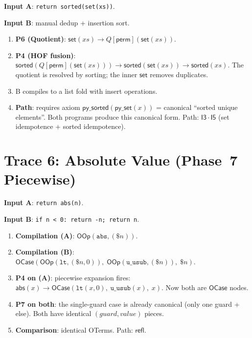 \documentclass[11pt,a4paper]{report}
\theoremstyle{definition}
\theoremstyle{plain}
\begin{document}
\textbf{Input A}: \texttt{return sorted(set(xs))}.

\textbf{Input B}: manual dedup + insertion sort.

\begin{enumerate}
  \item \textbf{P6 (Quotient)}: $\mathsf{set}(xs) \to
    Q[\mathsf{perm}](\mathsf{set}(xs))$.
  \item \textbf{P4 (HOF fusion)}:
    $\mathsf{sorted}(Q[\mathsf{perm}](\mathsf{set}(xs))) \to
    \mathsf{sorted}(\mathsf{set}(xs)) \to \mathsf{sorted}(xs)$.
    The quotient is resolved by sorting; the inner $\mathsf{set}$
    removes duplicates.
  \item B compiles to a list fold with insert operations.
  \item \textbf{Path}: requires axiom $\mathsf{py\_sorted}(\mathsf{py\_set}(x))$
    = canonical ``sorted unique elements''.  Both programs produce this
    canonical form.  Path: $\mathsf{I3} \cdot \mathsf{I5}$
    (set idempotence $+$ sorted idempotence).
\end{enumerate}

\section{Trace 6: Absolute Value (Phase~7 Piecewise)}

\textbf{Input A}: \texttt{return abs(n)}.

\textbf{Input B}: \texttt{if n < 0: return -n; return n}.

\begin{enumerate}
  \item \textbf{Compilation (A)}: $\mathsf{OOp}(\texttt{abs}, (\$n))$.

  \item \textbf{Compilation (B)}:
    $\mathsf{OCase}(\mathsf{OOp}(\texttt{lt}, (\$n, 0)),\;
    \mathsf{OOp}(\texttt{u\_usub}, (\$n)),\; \$n)$.

  \item \textbf{P4 on (A)}: piecewise expansion fires:
    $\mathsf{abs}(x) \to \mathsf{OCase}(\texttt{lt}(x, 0),\;
    \texttt{u\_usub}(x),\; x)$.  Now both are $\mathsf{OCase}$ nodes.

  \item \textbf{P7 on both}: the single-guard case is already
    canonical (only one guard + else).  Both have identical
    $(\mathit{guard}, \mathit{value})$ pieces.

  \item \textbf{Comparison}: identical OTerms.  Path: $\mathsf{refl}$.
\end{enumerate}
\end{document}
